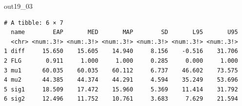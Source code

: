 \begin{MCMCout}{}{out19_03}
	\begin{verbatim}
# A tibble: 6 × 7
  name        EAP       MED       MAP        SD       L95       U95
  <chr> <num:.3!> <num:.3!> <num:.3!> <num:.3!> <num:.3!> <num:.3!>
1 diff     15.650    15.605    14.940     8.156    -0.516    31.706
2 FLG       0.911     1.000     1.000     0.285     0.000     1.000
3 mu1      60.035    60.035    60.112     6.737    46.602    73.575
4 mu2      44.385    44.374    44.291     4.594    35.249    53.696
5 sig1     18.509    17.472    15.960     5.369    11.414    31.792
6 sig2     12.496    11.752    10.761     3.683     7.629    21.594
\end{verbatim}
\end{MCMCout}
